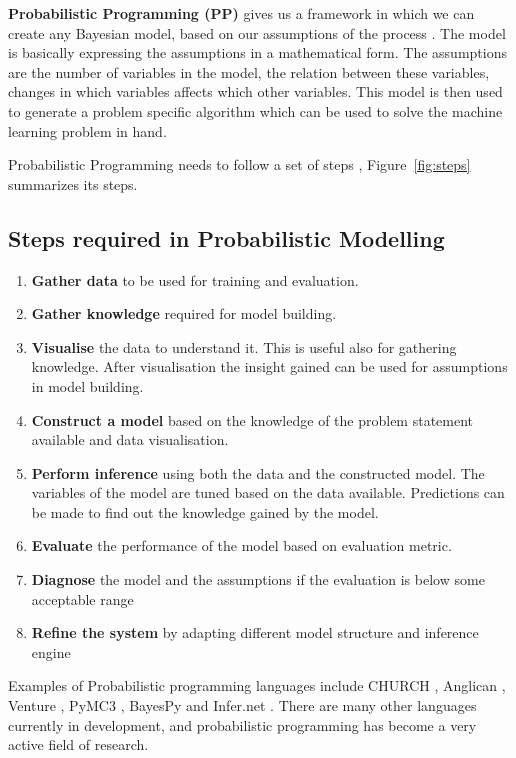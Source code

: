 \textbf{Probabilistic Programming  (PP)} gives us a framework in which we can create any Bayesian model, based on our assumptions of the process \cite{winn2016}. The model is basically expressing the assumptions in a mathematical form. The assumptions are the number of variables in the model, the relation between these variables, changes in which variables affects which other variables. This model is then used to generate a problem specific algorithm which can be used to solve the machine learning problem in hand. 

Probabilistic Programming needs to follow a set of steps \cite{winn2016}, Figure~\ref{fig:steps} summarizes its steps.
\subsection*{Steps required in Probabilistic Modelling}
\label{sub:steps}
\begin{enumerate}
	\item \textbf{Gather data} to be used for training and evaluation.
    \item \textbf{Gather knowledge} required for model building.
    \item \textbf{Visualise} the data to understand it. This is useful also for gathering knowledge. After visualisation the insight gained can be used for assumptions in model building.
    \item \textbf{Construct a model} based on the knowledge of the problem statement available and data visualisation. 
    \item \textbf{Perform inference} using both the data and the constructed model. The variables of the model are tuned based on the data available. Predictions can be made to find out the knowledge gained by the model.
    \item \textbf{Evaluate} the performance of the model based on evaluation metric.
    \item \textbf{Diagnose} the model and the assumptions if the evaluation is below some acceptable range
    \item \textbf{Refine the system} by adapting different model structure and inference engine

\end{enumerate}

Examples of Probabilistic programming languages include CHURCH \cite{goodman_church_2012}, Anglican \cite{wood2014new},  Venture \cite{mansinghka_venture_2014}, PyMC3 \cite{salvatier_probabilistic_2015}, BayesPy \cite{luttinen_bayespy_2014} and Infer.net \cite{minka_2010}. There are many other languages currently in development, and probabilistic programming has become a very active field of research.

